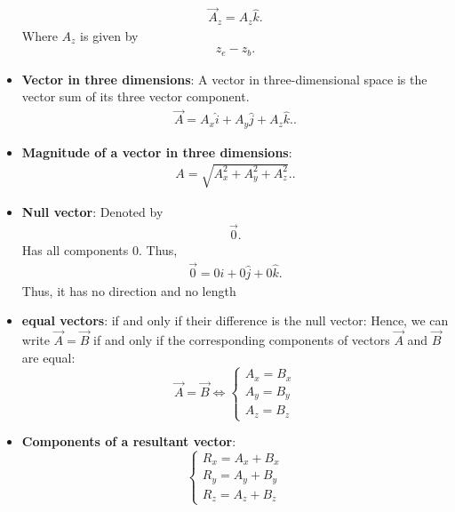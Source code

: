 \documentclass{report}
\begin{document}
\begin{itemize}
            \begin{align*}
                \vec{A}_{z} = A_{z}\hat{k} 
            .\end{align*}
            Where $A_{z}$ is given by 
            \begin{align*}
                z_{e} - z_{b}
            .\end{align*}
        \item \textbf{Vector in three dimensions}: A vector in three-dimensional space is the vector sum of its three vector component. 
            \begin{align*}
                \vec{A} = A_x \hat{i} + A_y \hat{j} + A_z \hat{k}.
            .\end{align*}
        \item \textbf{Magnitude of a vector in three dimensions}:
            \begin{align*}
                A = \sqrt{A_x^2 + A_y^2 + A_z^2}.
            .\end{align*}
        \item \textbf{Null vector}: Denoted by 
            \begin{align*}
                \vec{0}
            .\end{align*}
            Has all components 0. Thus, 
            \begin{align*}
                \vec{0} = 0\hat{i} + 0\hat{j} + 0\hat{k}
            .\end{align*}
            Thus, it has no direction and no length
        \item \textbf{equal vectors}: if and only if their difference is the null vector:
        Hence, we can write $\vec{A} = \vec{B}$ if and only if the corresponding components of vectors $\vec{A}$ and $\vec{B}$ are equal:
        \[
        \vec{A} = \vec{B} \Leftrightarrow
        \left\{
            \begin{array}{l}
                A_x = B_x \\
                A_y = B_y \\
                A_z = B_z
            \end{array}
        \right.
        \]
    \item \textbf{Components of a resultant vector}:
        \begin{equation}
            \begin{cases}
                R_{x} = A_{x}  + B_{x} \\
                R_{y} = A_{y}  + B_{y} \\
                R_{z} = A_{z}  + B_{z} 
            \end{cases}
        \end{equation}


\end{itemize}
\end{document}
